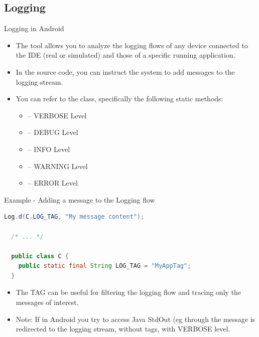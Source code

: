 \documentclass{beamer}
\begin{document}
  \subsection{Logging}
    \begin{frame}{Logging in Android}
      \begin{itemize}\itemsep10pt
        \item The  tool allows you to analyze the logging flows of any
        device connected to the IDE (real or simulated) and those of a specific
        running application.
        \item In the source code, you can instruct the system to add messages to
        the logging stream.
        \item You can refer to the  class, specifically
        the following static methods: 
      \begin{itemize}
      \item {} -- VERBOSE Level
      \item {} -- DEBUG Level
      \item {} -- INFO Level
      \item {} -- WARNING Level
      \item {} -- ERROR Level
    \end{itemize}
  \end{itemize}

  \begin{exampleblock}{Example - Adding a message to the Logging flow}
    \begin{lstlisting}[language=Java]
  Log.d(C.LOG_TAG, "My message content");

  /* ... */

  public class C {
    public static final String LOG_TAG = "MyAppTag";
  }
    \end{lstlisting}
  \end{exampleblock}

  \begin{itemize}\itemsep10pt
    \item The TAG can be useful for filtering the logging flow and tracing only
    the messages of interest.
    \item Note: If in Android you try to access Java StdOut (eg through
     the message is redirected to the
    logging stream, without tags, with VERBOSE level.
  \end{itemize}
  \end{frame}
\end{document}
